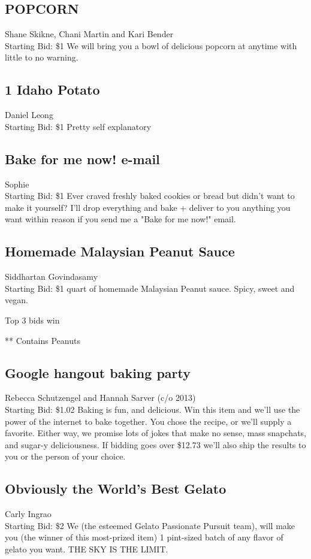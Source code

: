 \documentclass[11pt]{article}
\begin{document}
\subsection{POPCORN}
Shane Skikne, Chani  Martin and Kari Bender
\\
Starting Bid: \$1
\newline
We will bring you a bowl of delicious popcorn at anytime with little to no warning.
\subsection{1 Idaho Potato}
Daniel Leong
\\
Starting Bid: \$1
\newline
Pretty self explanatory
\subsection{Bake for me now! e-mail}
Sophie
\\
Starting Bid: \$1
\newline
Ever craved freshly baked cookies or bread but didn't want to make it yourself? I'll drop everything and bake + deliver to you anything you want within reason if you send me a "Bake for me now!" email.
\subsection{Homemade Malaysian Peanut Sauce}
Siddhartan Govindasamy
\\
Starting Bid: \$1
 quart of homemade Malaysian Peanut sauce. Spicy, sweet and vegan.

Top 3 bids win


** Contains Peanuts
\subsection{Google hangout baking party}
Rebecca Schutzengel and Hannah Sarver (c/o 2013)
\\
Starting Bid: \$1.02
\newline
Baking is fun, and delicious. Win this item and we'll use the power of the internet to bake together. You chose the recipe, or we'll supply a favorite. Either way, we promise lots of jokes that make no sense, mass snapchats, and sugar-y deliciousness. If bidding goes over \$12.73 we'll also ship the results to you or the person of your choice.
\subsection{Obviously the World's Best Gelato}
Carly Ingrao
\\
Starting Bid: \$2
\newline
We (the esteemed Gelato Passionate Pursuit team), will make you (the winner of this most-prized item) 1 pint-sized batch of any flavor of gelato you want. THE SKY IS THE LIMIT.
\end{document}
